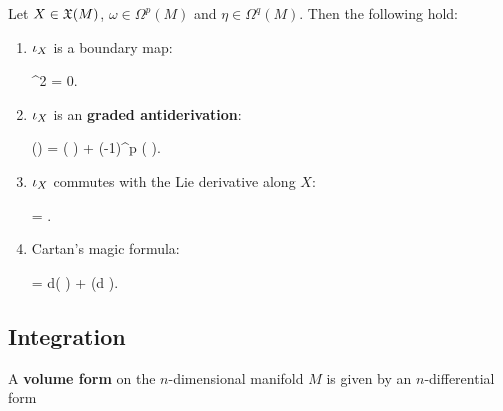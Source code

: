 \documentclass[main.tex]{subfiles}
\begin{document}
\begin{property}
	Let $X \in \fields(M)$, $\omega \in \Omega^p(M)$ and $\eta \in \Omega^q(M)$. Then the following hold:
	\begin{enumerate}
		\item $\ipr{X}$ is a boundary map:
		\begin{eqalign}
			^2 = 0.
		\end{eqalign}
		\item $\ipr{X}$ is an \textbf{graded antiderivation}:
		\begin{eqalign}
		\label{eq:int_prod_graded_antid}
			(\omega \wedge \eta) = ( \omega) \wedge \eta + (-1)^p \omega \wedge (\ipr{X} \eta).
		\end{eqalign}
		\item $$ commutes with the Lie derivative along $X$:
		\begin{eqalign}
			 \ipr{X} =  \Lie{X}.
		\end{eqalign}
		\item Cartan's magic formula:
		\begin{eqalign}
		\label{eq:cartan_magic_formula}
			 \omega = d( \omega) +  (d \omega).
		\end{eqalign}
	\end{enumerate}
\end{property}

\subsection{Integration}
\begin{definition}
	A \textbf{volume form} on the $n$-dimensional manifold $M$ is given by an $n$-differential form
\end{definition}
\end{document}
